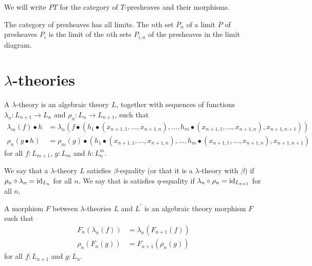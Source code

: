 We will write $ PT $ for the category of $ T $-presheaves and their morphisms.

\begin{remark}
  The category of presheaves has all limits. The $ n $th set $ \overline{P}_n $ of a limit $ \overline{P} $ of presheaves $ P_i $ is the limit of the $ n $th sets $ P_{i, n} $ of the presheaves in the limit diagram.
\end{remark}

\section{\texorpdfstring{$ \lambda $-}{lambda-}theories}

\begin{definition}
  A $ \lambda $-theory is an algebraic theory $ L $, together with sequences of functions $ \lambda_n: L_{n + 1} \to L_n $ and $ \rho_n: L_n \to L_{n + 1} $, such that
  \begin{align*}
    \lambda_m(f) \bullet h &= \lambda_n(f \bullet (h_1 \bullet (x_{n + 1, 1}, \dots, x_{n + 1, n}), \dots, h_m \bullet (x_{n + 1, 1}, \dots, x_{n + 1, n}), x_{n + 1, n + 1}))\\
    \rho_n(g \bullet h) &= \rho_m(g) \bullet (h_1 \bullet (x_{n + 1, 1}, \dots, x_{n + 1, n}), \dots, h_m \bullet (x_{n + 1, 1}, \dots, x_{n + 1, n}), x_{n + 1, n + 1})
  \end{align*}
  for all $ f: L_{m + 1} $, $ g: L_m $ and $ h: L_n^m $.
\end{definition}

\begin{definition}
  We say that a $ \lambda $-theory $ L $ satisfies $ \beta $-equality (or that it is a $ \lambda $-theory with $ \beta $) if $ \rho_n \circ \lambda_n = \text{id}_{L_n} $ for all $ n $. We say that is satisfies $ \eta $-equality if $ \lambda_n \circ \rho_n = \text{id}_{L_{n + 1}} $ for all $ n $.
\end{definition}

\begin{definition}
  A morphism $ F $ between $ \lambda $-theories $ L $ and $ L^\prime $ is an algebraic theory morphism $ F $ such that
  \begin{align*}
    F_n(\lambda_n(f)) &= \lambda_n(F_{n + 1}(f))\\
    \rho_n(F_n(g)) &= F_{n + 1}(\rho_n(g))
  \end{align*}
  for all $ f: L_{n + 1} $ and $ g: L_n $.
\end{definition}

